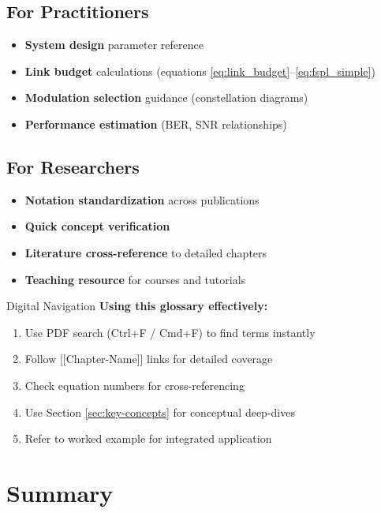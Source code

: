 \subsection{For Practitioners}
\begin{itemize}
\item \textbf{System design} parameter reference
\item \textbf{Link budget} calculations (equations \eqref{eq:link_budget}--\eqref{eq:fspl_simple})
\item \textbf{Modulation selection} guidance (constellation diagrams)
\item \textbf{Performance estimation} (BER, SNR relationships)
\end{itemize}

\subsection{For Researchers}
\begin{itemize}
\item \textbf{Notation standardization} across publications
\item \textbf{Quick concept verification}
\item \textbf{Literature cross-reference} to detailed chapters
\item \textbf{Teaching resource} for courses and tutorials
\end{itemize}

\begin{calloutbox}{Digital Navigation}
\textbf{Using this glossary effectively:}
\begin{enumerate}
\item Use PDF search (Ctrl+F / Cmd+F) to find terms instantly
\item Follow {[}{[}Chapter-Name{]}{]} links for detailed coverage
\item Check equation numbers for cross-referencing
\item Use Section \ref{sec:key-concepts} for conceptual deep-dives
\item Refer to worked example for integrated application
\end{enumerate}
\end{calloutbox}

\section{Summary}

